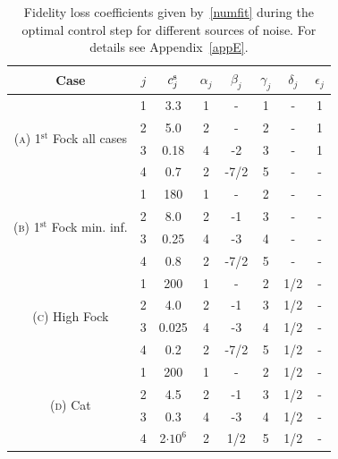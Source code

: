 \documentclass[reprint,prx,footinbib,floatfix,twocolumn,longbibliography,superscriptaddress]{revtex4-2}
\begin{document}
\begin{table}[t!]
\begin{tabular}{c||c||c|c|c|c|c|c}
\hline  \hline
          Case        & $j$ & $c_j^{\text{s}}$ & $\alpha_j$ &  $\beta_j$ & $\gamma_j$ & $\delta_j$ & $\epsilon_j$   \\ \hline \hline
\multirow{4}{*}{(\textsc{a}) 1$^{\text{st}}$ Fock all cases } & 1 & 3.3 & 1 & - & 1 & - & 1 \\ \cline{2-8} 
                  & 2 & 5.0 & 2 & - & 2 & - & 1 \\ \cline{2-8} 
                  & 3  & 0.18 & 4 & -2 & 3 & - & 1 \\ \cline{2-8}               
                  & 4 & 0.7 & 2 & -7/2 & 5 & - & - \\ \hline \hline
\multirow{4}{*}{(\textsc{b}) 1$^{\text{st}}$ Fock min. inf.} & 1 & 180 & 1 & - & 2 & - & - \\ \cline{2-8} 
                  & 2 & 8.0 & 2 & -1 & 3 & - & - \\ \cline{2-8} 
                  & 3 & 0.25 & 4 & -3 & 4 & - & - \\ \cline{2-8}                  
                  & 4 & 0.8 & 2 & -7/2 & 5 & - & - \\ \hline \hline
\multirow{4}{*}{(\textsc{c}) High Fock} & 1 & 200 & 1 & - & 2 & 1/2 & - \\ \cline{2-8} 
                  & 2 & 4.0 & 2 & -1 & 3 & 1/2 & - \\ \cline{2-8} 
                  & 3 & 0.025 & 4 & -3 & 4 & 1/2 & - \\ \cline{2-8}                   
                  & 4 & 0.2 & 2 & -7/2 & 5 & 1/2 & - \\ \hline \hline
\multirow{4}{*}{(\textsc{d}) Cat} & 1 & 200 & 1 & - & 2 & 1/2 & - \\ \cline{2-8} 
                  & 2 & 4.5 & 2 & -1 & 3 & 1/2 & - \\ \cline{2-8} 
                  & 3 & 0.3 & 4 & -3 & 4 & 1/2 & - \\ \cline{2-8}                    
                  & 4 & 2$\cdot10^6$ & 2 & 1/2 & 5 & 1/2 & - \\ \hline \hline
\end{tabular}
\caption{Fidelity loss coefficients given by~\eqref{numfit} during the optimal control step for different sources of noise. For details see Appendix~\ref{appE}.}
\label{tabnum}
\end{table}

\renewcommand{\theequation}{E\arabic{equation}}
\setcounter{equation}{0}
\end{document}
